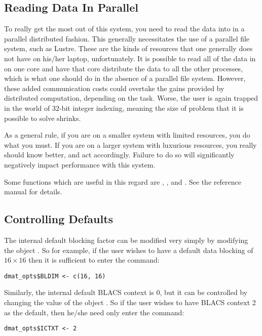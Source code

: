 \subsection{Reading Data In Parallel}

To really get the most out of this system, you need to read the data into  in a parallel distributed fashion.  This generally necessitates the use of a parallel file system, such as Lustre.  These are the kinds of resources that one generally does not have on his/her laptop, unfortunately.  It is possible to read all of the data in on one core and have that core distribute the data to all the other processes, which is what one should do in the absence of a parallel file system.  However, these added communication costs could  overtake the gains provided by distributed computation, depending on the task.  Worse, the user is again trapped in the world of 32-bit integer indexing, meaning the size of problem that it is possible to solve shrinks.

As a general rule, if you are on a smaller system with limited resources, you do what you must.  If you are on a larger system with luxurious resources, you really should know better, and act accordingly.  Failure to do so will significantly negatively impact performance with this system.

Some functions which are useful in this regard are , , and .  See the reference manual for details.





\subsection{Controlling Defaults}

The internal default blocking factor can be modified very simply by modifying 
the object .  So for example, if the user wishes to have a 
default data blocking of $16\times 16$ then it is sufficient to enter the 
command:
\begin{lstlisting}[language=rr]
dmat_opts$BLDIM <- c(16, 16)
\end{lstlisting}

Similarly, the internal default BLACS context is 0, but it can be controlled by 
changing the value of the object .  So if the user wishes 
to have BLACS context 2 as the default, then he/she need only enter the command:
\begin{lstlisting}[language=rr]
dmat_opts$ICTXT <- 2
\end{lstlisting}
